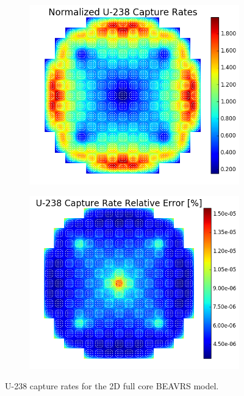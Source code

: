 \begin{figure}[h!]
\centering
\begin{subfigure}{0.44\textwidth}
  \centering
  \includegraphics[width=\linewidth]{figures/benchmarks/capture-rates/capt-mean-full-core}
  \caption{}
  \label{fig:chap7-capt-rate-mean-full-core}
\end{subfigure}%
\begin{subfigure}{0.44\textwidth}
  \centering
  \includegraphics[width=\linewidth]{figures/benchmarks/capture-rates/capt-rel-err-full-core}
  \caption{}
  \label{fig:chap7-capt-rate-rel-err-full-core}
\end{subfigure}%
\caption[U-238 capture rates for the full 2D BEAVRS core]{U-238 capture rates for the 2D full core \ac{BEAVRS} model.}
\label{fig:chap7-capt-rates-full-core}
\end{figure}

